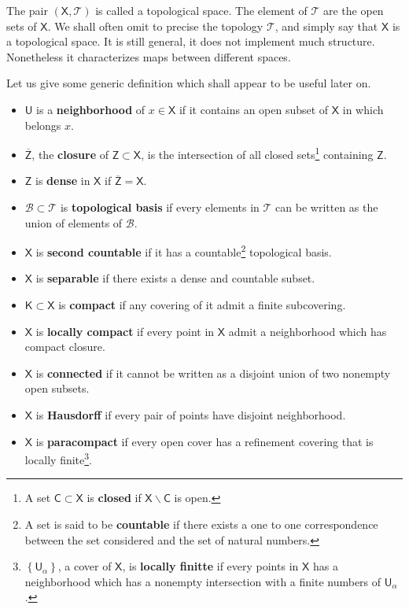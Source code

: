 \documentclass[11pt]{book}
\newcommand{\Bcal}{\mathcal{B}}
\newcommand{\Tcal}{\mathcal{T}}
\newcommand{\Csf}{\mathsf{C}}
\newcommand{\Ksf}{\mathsf{K}}
\newcommand{\Usf}{\mathsf{U}}
\newcommand{\Xsf}{\mathsf{X}}
\newcommand{\Zsf}{\mathsf{Z}}
\theoremstyle{break}
\begin{document}
The pair $(\Xsf,\Tcal)$ is called a topological space. The element of $\Tcal$ are the open sets of $\Xsf$. We shall often omit to precise the topology $\Tcal$, and simply say that $\Xsf$ is a topological space. It is still general, it does not implement much structure. Nonetheless it characterizes maps between different spaces. 





\bigskip


Let us give some generic definition which shall appear to be useful later on.%


\begin{itemize}
\vspace*{-4pt}
\setlength{\itemsep}{-1pt}%
%
\item $\Usf$ is a \textbf{neighborhood} of $x \in \Xsf$ if it contains an open subset of $\Xsf$ in which belongs $x$.%
%
\item $\overline{\Zsf}$, the \textbf{closure} of $\Zsf \subset \Xsf$, is the intersection of all closed sets\footnote{A set $\Csf \subset \Xsf$ is \textbf{closed} if $\Xsf \backslash \Csf$ is open.} containing $\Zsf$.%
%
\item $\Zsf$ is \textbf{dense} in $\Xsf$ if $\overline{\Zsf} = \Xsf$.%
%
\item $\Bcal \subset \Tcal$ is \textbf{topological basis} if every elements in $\Tcal$ can be written as the union of elements of $\Bcal$.%
%
\item $\Xsf$ is \textbf{second countable} if it has a countable\footnote{A set is said to be \textbf{countable} if there exists a one to one correspondence between the set considered and the set of natural numbers.} topological basis.%
%
\item $\Xsf$ is \textbf{separable} if there exists a dense and countable subset.%
%
\item $\Ksf \subset \Xsf$ is \textbf{compact} if any covering of it admit a finite subcovering.%
%
\item $\Xsf$ is \textbf{locally compact} if every point in $\Xsf$ admit a neighborhood which has compact closure.%
%
\item $\Xsf$ is \textbf{connected} if it cannot be written as a disjoint union of two nonempty open subsets.%
%
\item $\Xsf$ is \textbf{Hausdorff} if every pair of points have disjoint neighborhood.%
%
\item $\Xsf$ is \textbf{paracompact} if every open cover has a refinement covering that is locally finite\footnote{$\left\{\Usf_\alpha\right\}$, a cover of $\Xsf$, is \textbf{locally finitte} if every points in $\Xsf$ has a neighborhood which has a nonempty intersection with a finite numbers of $\Usf_\alpha$.}.%
%
\end{itemize}
\end{document}
